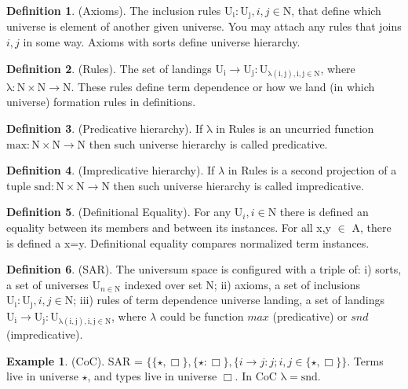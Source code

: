 \documentclass{article}
\theoremstyle{definition}
\newtheorem{definition}{Definition}
\newtheorem{example}{Example}
\begin{document}
\begin{definition} (Axioms). The inclusion rules {\bf $\mathrm{U_i : U_j}, i,j \in \mathrm{N}$},
that define which universe is element of another given universe. You may attach
any rules that joins $i,j$ in some way. Axioms with sorts define universe hierarchy.
\end{definition}

\begin{definition} (Rules). The set of landings
$\mathrm{U_i} \rightarrow \mathrm{U_j} : \mathrm{U_{\lambda(i,j), i,j \in \mathrm{N}}}$,
where $\mathrm{\lambda : N \times N \rightarrow N}$. These rules define term dependence or
how we land (in which universe) formation rules in definitions.
\end{definition}

\begin{definition} (Predicative hierarchy). If $\mathrm{\lambda}$ in Rules
is an uncurried function $\mathrm{max : N \times N \rightarrow N}$
then such universe hierarchy is called predicative.
\end{definition}

\begin{definition} (Impredicative hierarchy). If $\lambda$ in Rules
is a second projection of a tuple $\mathrm{snd : N \times N \rightarrow N}$
then such universe hierarchy is called impredicative.
\end{definition}

\begin{definition} (Definitional Equality). For any $\mathrm{U}_i, i \in \mathrm{N}$ there is
defined an equality between its members and between its instances.
For all x,y $\in$ A, there is defined a x=y. Definitional equality
compares normalized term instances.
\end{definition}

\begin{definition} (SAR). The universum space is configured with a triple of:
i) sorts, a set of universes  $\mathrm{U}_{n \in \mathrm{N}}$ indexed over set N;
ii) axioms, a set of inclusions {\bf $\mathrm{U_i : U_j}, i,j \in \mathrm{N}$};
iii) rules of term dependence universe landing, a set of landings
$\mathrm{U_i} \rightarrow \mathrm{U_j} : \mathrm{U_{\lambda(i,j), i,j \in \mathrm{N}}}$, where $\lambda$ could be function $max$ (predicative) or $snd$ (impredicative).
\end{definition}

\begin{example} (CoC). SAR = $\{ \{\star , \Box \},\{ \star : \Box \},
        \{ i \rightarrow j : j; i, j \in \{ \star, \Box \}
        \}$. Terms live in universe $\star$, and types live in universe $\Box$. In CoC $\mathrm{\lambda=snd}$.
\end{example}
\end{document}
